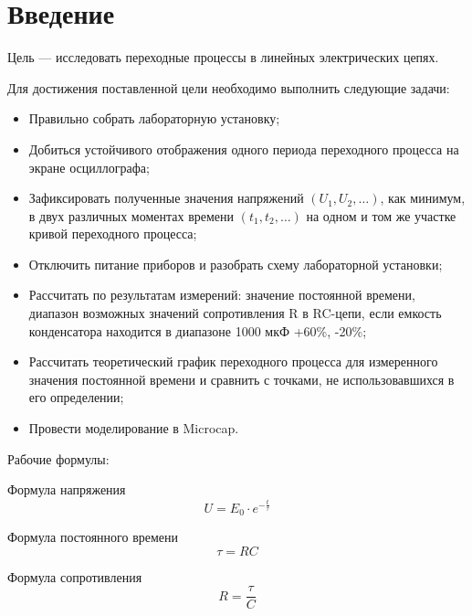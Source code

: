 \chapter*{Введение}
\label{ch:intro}
Цель — исследовать переходные процессы в линейных электрических цепях.

Для достижения поставленной цели необходимо выполнить следующие задачи:
\begin{itemize}
    \item Правильно собрать лабораторную установку;
    \item Добиться устойчивого отображения одного периода переходного процесса на экране осциллографа;
    \item Зафиксировать полученные значения напряжений $\left(U_1, U_2, \dots \right)$, как минимум, в двух различных моментах времени $\left(t_1, t_2, \dots \right)$ на одном и том же участке кривой переходного процесса;
    \item Отключить питание приборов и разобрать схему лабораторной установки;
    \item Рассчитать по результатам измерений: значение постоянной времени, диапазон возможных значений сопротивления R в RC-цепи, если емкость конденсатора находится в диапазоне 1000 мкФ +60\%, -20\%;
    \item Рассчитать теоретический график переходного процесса для измеренного значения постоянной времени и сравнить с точками, не использовавшихся в его определении;
    \item Провести моделирование в Microcap.
\end{itemize}

Рабочие формулы:

Формула напряжения
\begin{equation}
\label{eq:e1}
U=E_0 \cdot e^{-\frac{t}{\tau}}
\end{equation}

Формула постоянного времени
\begin{equation}
\label{eq:e2}
\tau=RC
\end{equation}

Формула сопротивления
\begin{equation}
\label{eq:e3}
R = \frac{\tau}{C}
\end{equation}


\endinput